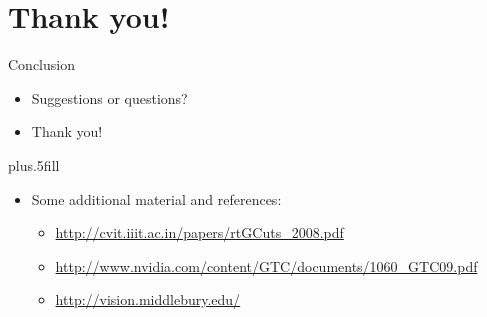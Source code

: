 \documentclass{beamer}
\begin{document}

\section*{Thank you!}

\begin{frame}{Conclusion}

  \begin{itemize}
  \item
    Suggestions or questions?
  \item
    \alert{Thank you!}
  \end{itemize}
  
  \vskip0pt plus.5fill
  \begin{itemize}
  \item
    Some additional material and references:
    \begin{itemize}
    \item
      \url{http://cvit.iiit.ac.in/papers/rtGCuts_2008.pdf}
    \item
      \url{http://www.nvidia.com/content/GTC/documents/1060_GTC09.pdf}
    \item
      \url{http://vision.middlebury.edu/}
    \end{itemize}
  \end{itemize}
\end{frame}
\end{document}
